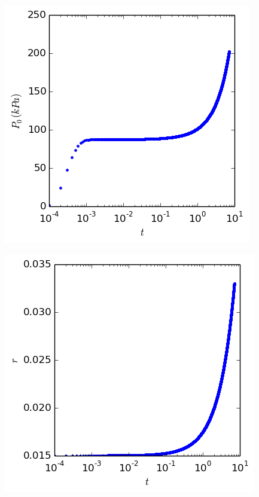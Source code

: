 \documentclass[cleanfoot,cleanhead,twocolumn,10pt,notitlepage]{asme2e}
\begin{document}
\includegraphics[width=\linewidth]{../python_stuff/Part1/P0.png}

\includegraphics[width=\linewidth]{../python_stuff/Part1/r.png}
\end{document}
